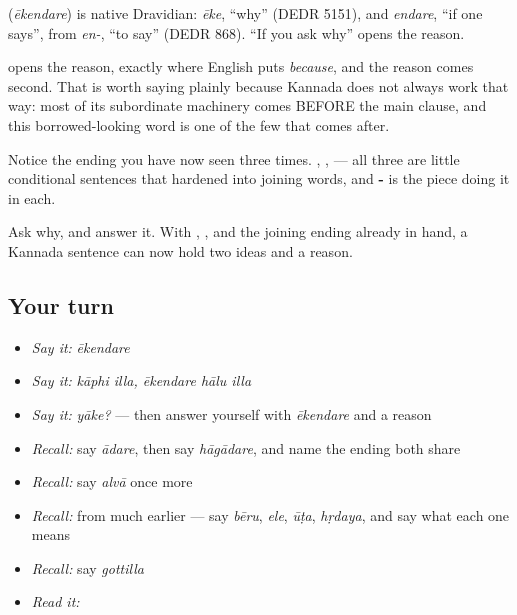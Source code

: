 \begin{cousinweb}
\textbf{} (\emph{ēkendare}) is native Dravidian: \emph{ēke}, \textquotedblleft{}why\textquotedblright{} (DEDR 5151), and \emph{endare}, \textquotedblleft{}if one says\textquotedblright{}, from \emph{en-}, \textquotedblleft{}to say\textquotedblright{} (DEDR 868). \textquotedblleft{}If you ask why\textquotedblright{} opens the reason.
\end{cousinweb}

\begin{grammarlens}[title={Grammar Lens: the same ending, for the third time}]
 opens the reason, exactly where English puts \emph{because}, and the reason comes second. That is worth saying plainly because Kannada does not always work that way: most of its subordinate machinery comes BEFORE the main clause, and this borrowed-looking word is one of the few that comes after.

Notice the ending you have now seen three times. , ,  — all three are little conditional sentences that hardened into joining words, and \textbf{-} is the piece doing it in each.
\end{grammarlens}

\begin{grammarlens}[title={What you've built}]
Ask why, and answer it. With , ,  and the joining ending already in hand, a Kannada sentence can now hold two ideas and a reason.
\end{grammarlens}

\subsection*{Your turn}
\begin{itemize}
\raggedright
  \item \emph{Say it:} \emph{ēkendare}
  \item \emph{Say it:} \emph{kāphi illa, ēkendare hālu illa}
  \item \emph{Say it:} \emph{yāke?} — then answer yourself with \emph{ēkendare} and a reason
  \item \emph{Recall:} say \emph{ādare}, then say \emph{hāgādare}, and name the ending both share
  \item \emph{Recall:} say \emph{alvā} once more
  \item \emph{Recall:} from much earlier — say \emph{bēru}, \emph{ele}, \emph{ūṭa}, \emph{hṛdaya}, and say what each one means
  \item \emph{Recall:} say \emph{gottilla}
  \item \emph{Read it:} \textbf{ }
\end{itemize}

